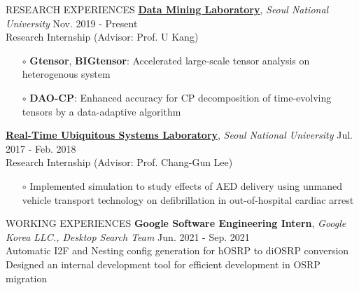 \documentclass[10pt]{resume} %
\begin{document}
\begin{rSection}{RESEARCH EXPERIENCES}
\href{https://datalab.snu.ac.kr/}{\textbf{Data Mining Laboratory}}, \textit{Seoul National University} \hfill Nov. 2019 - Present \\
Research Internship (Advisor: Prof. U Kang)
\vspace{-1mm}
\begin{itemize}
  \item[$\circ$] \textbf{Gtensor}, \textbf{BIGtensor}: Accelerated large-scale tensor analysis on heterogenous system \vspace{-1mm}
  \item[$\circ$] \textbf{DAO-CP}: Enhanced accuracy for CP decomposition of time-evolving tensors by a data-adaptive algorithm
\end{itemize}
\href{https://rubis.snu.ac.kr/}{\textbf{Real-Time Ubiquitous Systems Laboratory}}, \textit{Seoul National University} \hfill Jul. 2017 - Feb. 2018 \\
Research Internship (Advisor: Prof. Chang-Gun Lee)
\vspace{-1mm}
\begin{itemize}
  \item[$\circ$] Implemented simulation to study effects of AED delivery using unmaned vehicle transport technology on defibrillation in out-of-hospital cardiac arrest
\end{itemize}
\end{rSection}

\begin{rSection}{WORKING EXPERIENCES}
{\bf Google Software Engineering Intern}, \textit{Google Korea LLC., Desktop Search Team} \hfill Jun. 2021 - Sep. 2021 \\ 
Automatic I2F and Nesting config generation for hOSRP to diOSRP conversion \\
Designed an internal development tool for efficient development in OSRP migration \\
\end{rSection}
\end{document}
